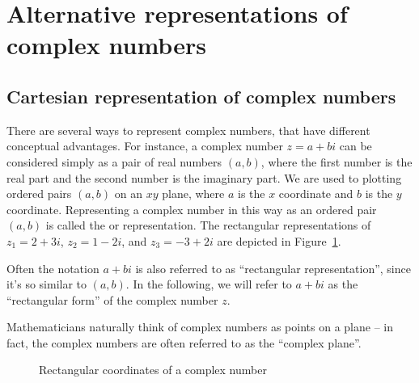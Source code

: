 \section{Alternative representations of complex numbers}\label{complex_graphical}
\subsection{Cartesian representation of complex numbers}
There are several ways to represent complex numbers, that have different conceptual advantages.
For instance, a complex number $z=a+bi$ can be considered simply as a pair of real numbers $(a,b)$, where the first number is the real part and the second number is the imaginary part. We are used to plotting ordered pairs $(a,b)$  on an $xy$ plane, where $a$ is the $x$ coordinate and $b$
is the $y$ coordinate. Representing a complex number in this way as an ordered pair $(a,b)$  is called the 
 or  representation. The rectangular
representations of $z_{1}=2+3i$, $z_{2}=1-2i$, and $z_{3}=-3+2i$
are depicted in Figure~\ref{rectcoord}.

Often the notation $a + bi$ is also referred to as ``rectangular representation'', since it's so similar to $(a,b)$. In the following, we will refer to $a + bi$ as the ``rectangular form'' of the complex number $z$.

Mathematicians naturally think of complex numbers as points on a plane -- in fact, the complex numbers are often referred to as the ``complex plane''.
%
\begin{figure}[hbt]  %
\begin{center}
\end{center}
\caption{Rectangular coordinates of a complex number}
\label{rectcoord}
\end{figure}


